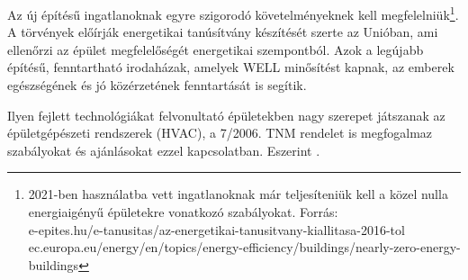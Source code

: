 Az új építésű ingatlanoknak egyre szigorodó követelményeknek kell megfelelniük\footnote{2021-ben használatba vett ingatlanoknak már teljesíteniük kell a közel nulla energiaigényű épületekre vonatkozó szabályokat. Forrás: \\ e-epites.hu/e-tanusitas/az-energetikai-tanusitvany-kiallitasa-2016-tol \\ ec.europa.eu/energy/en/topics/energy-efficiency/buildings/nearly-zero-energy-buildings}.
A törvények előírják energetikai tanúsítvány készítését szerte az Unióban, ami ellenőrzi az épület megfelelőségét energetikai szempontból.
Azok a legújabb építésű, fenntartható irodaházak, amelyek WELL minősítést kapnak, az emberek egészségének és jó közérzetének fenntartását is segítik.

Ilyen fejlett technológiákat felvonultató épületekben nagy szerepet játszanak az épületgépészeti rendszerek (HVAC),
a 7/2006. TNM rendelet\cite{TNM2006} is megfogalmaz szabályokat és ajánlásokat ezzel kapcsolatban. Eszerint . 







